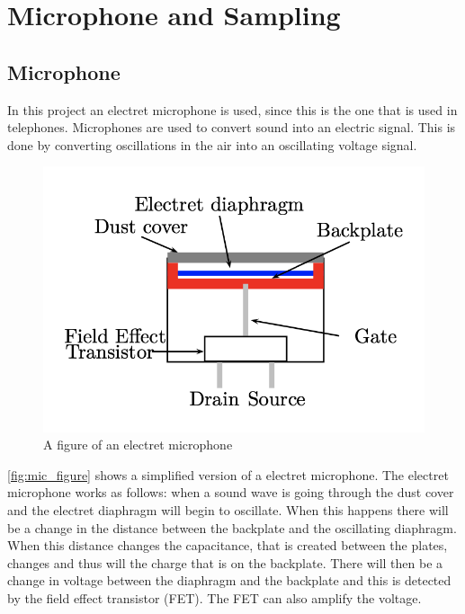 \chapter{Microphone and Sampling}

\section{Microphone}
In this project an electret microphone is used, since this is the one that is used in telephones. 
Microphones are used to convert sound into an electric signal. This is done by converting oscillations in the air into an oscillating voltage signal. 

\begin{figure}[H]
    \centering
    \includegraphics[scale=0.65]{figures/Microphone_figure.png}
    \caption{A figure of an electret microphone \cite[p. 160]{LectureNotes}}
    \label{fig:mic_figure}
\end{figure}

\autoref{fig:mic_figure} shows a simplified version of a electret microphone. The electret microphone works as follows: when a sound wave is going through the dust cover and the electret diaphragm will begin to oscillate. When this happens there will be a change in the distance between the backplate and the oscillating diaphragm. When this distance changes the capacitance, that is created between the plates, changes and thus will the charge that is on the backplate. There will then be a change in voltage between the diaphragm and the backplate and this is detected by the field effect transistor (FET). The FET can also amplify the voltage. \\

